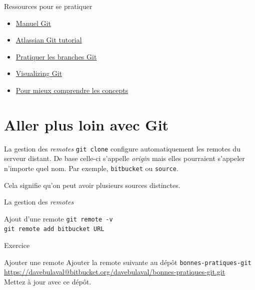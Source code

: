 \documentclass[11pt]{beamer}
\begin{document}
\begin{frame}{Ressources pour se pratiquer}
	\begin{itemize}
		\item  \href{https://git-scm.com/docs/user-manual.html}{Manuel Git}
		\item \href{https://www.atlassian.com/git/tutorials}{Atlassian Git tutorial}
		\item \href{https://learngitbranching.js.org/}{Pratiquer les branches Git}
		\item \href{http://git-school.github.io/visualizing-git/}{Visualizing Git}
		\item \href{https://dev.to/unseenwizzard/learn-git-concepts-not-commands-4gjc}{Pour mieux comprendre les concepts}
	\end{itemize}
\end{frame}


\section{Aller plus loin avec Git}


\begin{frame}[fragile]{La gestion des \textit{remotes}}
	\verb|git clone| configure automatiquement les remotes du serveur distant. De base celle-ci s'appelle \textit{origin} mais elles pourraient s'appeler n'importe quel nom. Par exemple, \verb|bitbucket| ou \verb|source|. 
	
	\bigskip	
	Cela signifie qu'on peut avoir plusieurs sources \textit{} distinctes. 
\end{frame}

\begin{frame}[fragile]{La gestion des \textit{remotes}}
	\begin{block}{Ajout d'une remote}
		\verb|git remote -v| \\
		\verb|git remote add bitbucket URL|
	\end{block}
\end{frame}

\begin{frame}[fragile]{Exercice}
	\begin{block}{Ajouter une remote}
		Ajouter la remote suivante au dépôt \verb|bonnes-pratiques-git|\\
		\url{https://davebulaval@bitbucket.org/davebulaval/bonnes-pratiques-git.git} \\
		Mettez à jour avec ce dépôt.
	\end{block}
\end{frame}
\end{document}

